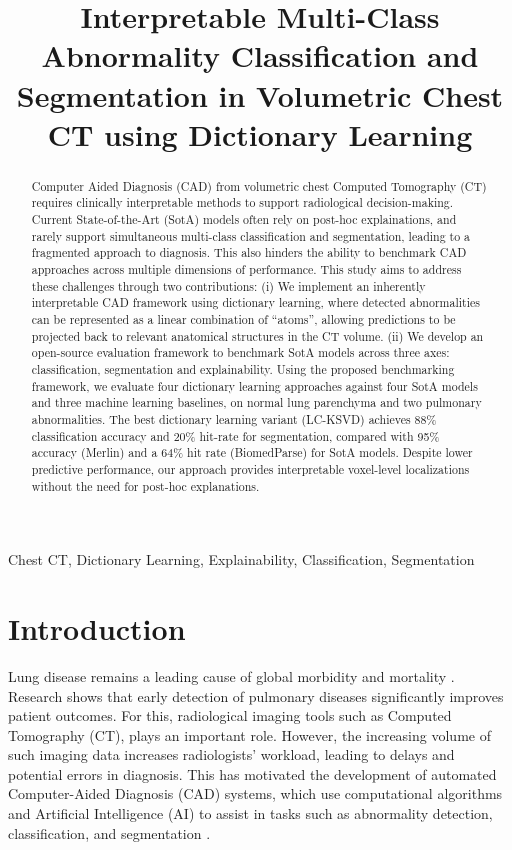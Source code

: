 \documentclass{article}
\title{Interpretable Multi-Class Abnormality Classification and Segmentation in Volumetric Chest CT using Dictionary Learning}
\begin{document}
%
\maketitle
%
\begin{abstract}
Computer Aided Diagnosis (CAD) from volumetric chest Computed Tomography (CT) requires clinically interpretable
methods to support radiological decision-making. Current State-of-the-Art (SotA) models often rely
on post-hoc explainations, and rarely support simultaneous multi-class classification and segmentation,
leading to a fragmented approach to diagnosis. This also hinders the ability to benchmark CAD approaches across multiple
dimensions of performance. This study aims to address these challenges through two contributions: (i) We implement an
inherently interpretable CAD framework using dictionary learning, where detected abnormalities can
be represented as a linear combination of “atoms”, allowing predictions to be projected back to relevant anatomical structures
in the CT volume. (ii) We develop an open-source evaluation framework to benchmark SotA models across three axes:
classification, segmentation and explainability. Using the proposed benchmarking framework, we evaluate
four dictionary learning approaches against four SotA models and three machine learning baselines, on normal lung parenchyma
and two pulmonary abnormalities. The best dictionary learning variant (LC-KSVD) achieves 88\% classification accuracy and
20\% hit-rate for segmentation, compared with 95\% accuracy (Merlin) and a 64\% hit rate (BiomedParse) for SotA models.
Despite lower predictive performance, our approach provides interpretable voxel-level localizations without the need for post-hoc explanations.
\end{abstract}
%
\begin{keywords}
Chest CT, Dictionary Learning, Explainability, Classification, Segmentation
\end{keywords}
%
\section{Introduction}
\label{sec:intro}

Lung disease remains a leading cause of global morbidity and mortality \cite{murray2022global}. Research shows that early detection of
pulmonary diseases significantly improves patient outcomes. For this, radiological imaging tools such as
Computed Tomography (CT), plays an important role. However, the increasing volume of such imaging data
increases radiologists' workload, leading to delays and potential errors in diagnosis. This has motivated the development of
automated Computer-Aided Diagnosis (CAD) systems, which use computational algorithms and Artificial Intelligence (AI)
to assist in tasks such as abnormality detection, classification, and segmentation \cite{doi2007computer}.
\end{document}

